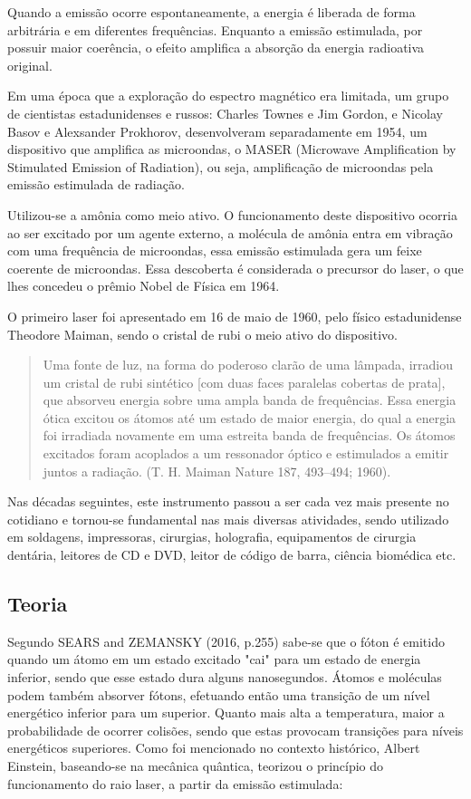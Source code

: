 \documentclass[numeric]{fei}
\begin{document}
Quando a emissão ocorre espontaneamente, a energia é liberada de forma arbitrária e em diferentes frequências. Enquanto a emissão estimulada, por possuir maior coerência, o efeito amplifica a absorção da energia radioativa original.

Em uma época que a exploração do espectro magnético era limitada, um grupo de cientistas estadunidenses e russos: Charles Townes e Jim Gordon, e Nicolay Basov e Alexsander Prokhorov, desenvolveram separadamente em 1954, um dispositivo que amplifica as microondas, o MASER (Microwave Amplification by Stimulated Emission of Radiation), ou seja, amplificação de microondas pela emissão estimulada de radiação.

Utilizou-se a amônia como meio ativo. O funcionamento deste dispositivo ocorria ao ser excitado por um agente externo, a molécula de amônia entra em vibração com uma frequência de microondas, essa emissão estimulada gera um feixe coerente de microondas. Essa descoberta é considerada o precursor do laser, o que lhes concedeu o prêmio Nobel de Física em 1964.

O primeiro laser foi apresentado em 16 de maio de 1960, pelo físico estadunidense Theodore Maiman, sendo o cristal de rubi o meio ativo do dispositivo.

\begin{quote}
Uma fonte de luz, na forma do poderoso clarão de uma lâmpada, irradiou um cristal de rubi sintético [com duas faces paralelas cobertas de prata], que absorveu energia sobre uma ampla banda de frequências. Essa energia ótica excitou os átomos até um estado de maior energia, do qual a energia foi irradiada novamente em uma estreita banda de frequências. Os átomos excitados foram acoplados a um ressonador óptico e estimulados a emitir juntos a radiação. (T. H. Maiman Nature 187, 493–494; 1960).
\end{quote}

Nas décadas seguintes, este instrumento passou a ser cada vez mais presente no cotidiano e tornou-se fundamental nas mais diversas atividades, sendo utilizado em soldagens, impressoras, cirurgias, holografia, equipamentos de cirurgia dentária, leitores de CD e DVD, leitor de código de barra, ciência biomédica etc.

\subsection{Teoria}

\par
Segundo SEARS and ZEMANSKY (2016, p.255) sabe-se que o fóton é emitido quando um átomo em um estado excitado "cai" para um estado de energia inferior, sendo que esse estado dura alguns nanosegundos. Átomos e moléculas podem também absorver fótons, efetuando então uma transição de um nível energético inferior para um superior. Quanto mais alta a temperatura, maior a probabilidade de ocorrer colisões, sendo que estas provocam transições para níveis energéticos superiores.
Como foi mencionado no contexto histórico, Albert Einstein, baseando-se na mecânica quântica, teorizou o princípio do funcionamento do raio laser, a partir da emissão estimulada:
\end{document}
